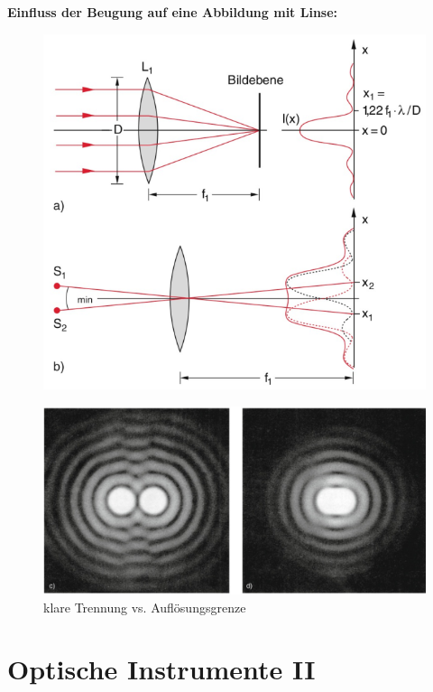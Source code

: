 \documentclass[a4paper, 11pt, ngerman, parskip=half-]{scrartcl}
\begin{document}
\textbf{Einfluss der Beugung auf eine Abbildung mit Linse:}
\begin{figure}[H]
    \centering
	\begin{minipage}{0.5\linewidth}
		\centering
		\includegraphics[width=\linewidth]{image/20/13.png}
	\end{minipage}%
	\begin{minipage}{0.45\linewidth}
		\center
		\includegraphics[width=\linewidth]{image/20/beugungsbegrenze_abbildung.png}
		klare Trennung vs. Auflösungsgrenze
	\end{minipage}
\end{figure}

\newpage

\section{Optische Instrumente II}
\end{document}
